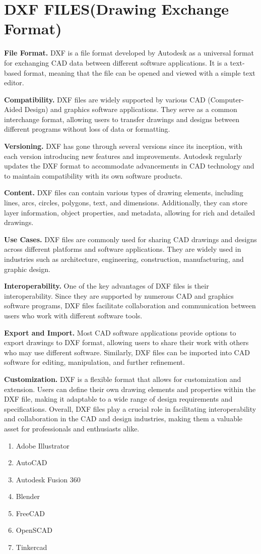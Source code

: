 \chapter{DXF FILES(Drawing Exchange Format)}


\noindent\textbf{File Format.} DXF is a file format developed by Autodesk as a universal format
for exchanging CAD data between different software applications.
It is a text-based format, meaning that the file can be opened and viewed with a simple text editor.

\noindent\textbf{Compatibility.} DXF files are widely supported by various CAD (Computer-Aided Design)
and graphics software applications.
They serve as a common interchange format,
allowing users to transfer drawings
and designs between different programs without loss of data or formatting.

\noindent\textbf{Versioning.} DXF has gone through several versions since its inception,
with each version introducing new features and improvements.
Autodesk regularly updates the DXF format to accommodate advancements in CAD technology
and to maintain compatibility with its own software products.

\noindent\textbf{Content.} DXF files can contain various types of drawing elements,
including lines, arcs, circles, polygons, text, and dimensions.
Additionally, they can store layer information, object properties,
and metadata, allowing for rich and detailed drawings.

\noindent\textbf{Use Cases.} DXF files are commonly used for sharing CAD drawings and designs across different platforms
and software applications.
They are widely used in industries such as architecture,
engineering, construction, manufacturing, and graphic design.

\noindent\textbf{Interoperability.} One of the key advantages of DXF files is their interoperability.
Since they are supported by numerous CAD and graphics software programs,
DXF files facilitate collaboration and communication between users
who work with different software tools.

\noindent\textbf{Export and Import.} Most CAD software applications provide options to export drawings to DXF format,
allowing users to share their work with others who may use different software.
Similarly, DXF files can be imported into CAD software for editing, manipulation, and further refinement.

\noindent\textbf{Customization.} DXF is a flexible format that allows for customization and extension.
Users can define their own drawing elements and properties within the DXF file,
making it adaptable to a wide range of design requirements and specifications.
Overall, DXF files play a crucial role in facilitating interoperability
and collaboration in the CAD and design industries,
making them a valuable asset for professionals and enthusiasts alike.

\begin{enumerate}
\item Adobe Illustrator
\item AutoCAD
\item Autodesk Fusion 360
\item Blender
\item FreeCAD
\item OpenSCAD
\item Tinkercad
\end{enumerate}

